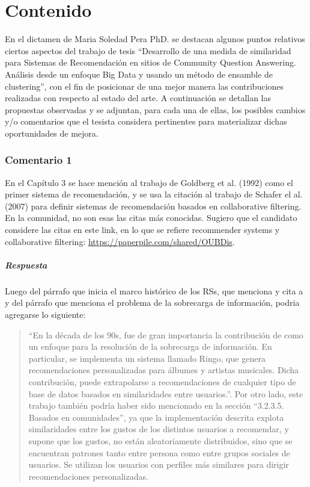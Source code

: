 \chapter*{Contenido}\label{ch:contenido}
En el dictamen de Maria Soledad Pera PhD. se destacan algunos puntos relativos ciertos aspectos del trabajo de tesis “Desarrollo de una medida de similaridad para Sistemas de Recomendación en sitios de Community Question Answering. Análisis desde un enfoque Big Data y usando un método de ensamble de clustering”, con el fin de posicionar de una mejor manera las contribuciones realizadas con respecto al estado del arte. A continuación se detallan las propuestas observadas y se adjuntan, para cada una de ellas, los posibles cambios y/o comentarios que el tesista considera pertinentes para materializar dichas oportunidades de mejora.

\subsection*{Comentario 1}
En el Capítulo 3 se hace mención al trabajo de Goldberg et al. (1992) como el primer sistema de recomendación, y se usa la citación al trabajo de Schafer el al. (2007) para definir sistemas de recomendación basados en collaborative filtering. En la comunidad, no son esas las citas más conocidas. Sugiero que el candidato considere las citas en este link, en lo que se refiere recommender systems y collaborative filtering: \url{https://paperpile.com/shared/OUBDis}.

\paragraph*{Respuesta}
Luego del párrafo que inicia el marco histórico de los RSs, que menciona y cita a \citep{goldberg1992using} y del párrafo que menciona el problema de la sobrecarga de información, podria agregarse lo siguiente:

\begin{quotation}
“En la década de los 90s, fue de gran importancia la contribución de \citep{shardanand1995social} como un enfoque para la resolución de la sobrecarga de información. En particular, se implementa un sistema llamado Ringo, que genera recomendaciones personalizadas para álbumes y artistas musicales. Dicha contribución, puede extrapolarse a recomendaciones de cualquier tipo de base de datos basados en similaridades entre usuarios.”. Por otro lado, este trabajo también podría haber sido mencionado en la sección “3.2.3.5. Basados en comunidades”, ya que la implementación descrita explota similaridades entre los gustos de los distintos usuarios a recomendar, y supone que los gustos, no están aleatoriamente distribuidos, sino que se encuentran patrones tanto entre persona como entre grupos sociales de usuarios. Se utilizan los usuarios con perfiles más similares para dirigir recomendaciones personalizadas.
\end{quotation}


